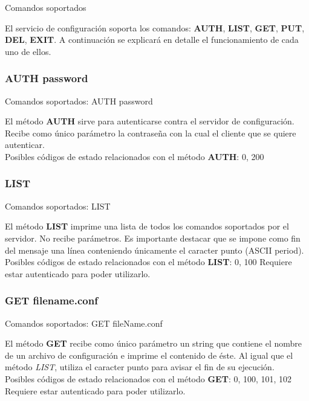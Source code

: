 \documentclass{beamer}
\begin{document}
\begin{frame}{Comandos soportados}
\par El servicio de configuración soporta los comandos: \textbf{AUTH}, \textbf{LIST}, \textbf{GET}, \textbf{PUT}, \textbf{DEL}, \textbf{EXIT}. A continuación se explicará en detalle el funcionamiento de cada uno de ellos.

\end{frame}


\subsubsection{AUTH password}
\begin{frame}{Comandos soportados: AUTH password}

\par El método \textbf{AUTH} sirve para autenticarse contra el servidor de configuración. Recibe como único parámetro la contraseña con la cual el cliente que se quiere autenticar.\\[0.5cm]
Posibles códigos de estado relacionados con el método \textbf{AUTH}: 0, 200
\end{frame}

\subsubsection{LIST}

\begin{frame}{Comandos soportados: LIST}

\par El método \textbf{LIST} imprime una lista de todos los comandos soportados por el servidor. No recibe parámetros. Es importante destacar que se impone como fin del mensaje una línea conteniendo únicamente el caracter punto (ASCII period).\\[0.5cm]
Posibles códigos de estado relacionados con el método \textbf{LIST}: 0, 100
Requiere estar autenticado para poder utilizarlo.
\end{frame}

\subsubsection{GET filename.conf}

\begin{frame}{Comandos soportados: GET fileName.conf}

\par El método \textbf{GET} recibe como único parámetro un string que contiene el nombre de un archivo de configuración e imprime el contenido de éste. Al igual que el método \textit{LIST}, utiliza el caracter punto para avisar el fin de su ejecución.\\[0.5cm]
Posibles códigos de estado relacionados con el método \textbf{GET}: 0, 100, 101, 102
Requiere estar autenticado para poder utilizarlo.
\end{frame}
\end{document}
